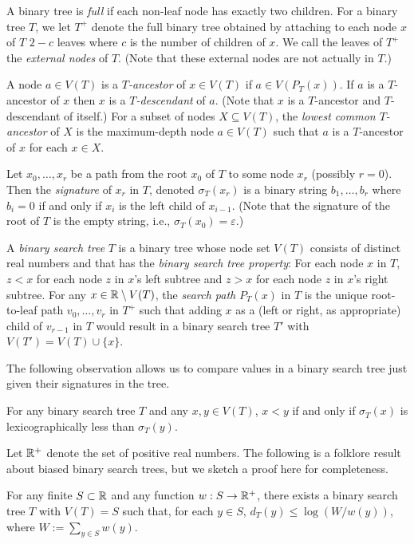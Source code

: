 \documentclass[kpfonts]{patmorin}
\let\le\leqslant
\begin{document}
A binary tree is \emph{full} if each non-leaf node has exactly two children. For a binary tree $T$, we let $T^+$ denote the full binary tree obtained by attaching to each node $x$ of $T$ $2-c$ leaves where $c$ is the number of children of $x$.  We call the leaves of $T^+$ the \emph{external nodes} of $T$.  (Note that these external nodes are not actually in $T$.)

A node $a\in V(T)$ is a \emph{$T$-ancestor} of $x\in V(T)$ if $a\in V(P_T(x))$. If $a$ is a $T$-ancestor of $x$ then $x$ is a \emph{$T$-descendant} of $a$. (Note that $x$ is a $T$-ancestor and $T$-descendant of itself.)  For a subset of nodes $X\subseteq V(T)$, the \emph{lowest common $T$-ancestor} of $X$ is the maximum-depth node $a\in V(T)$ such that $a$ is a $T$-ancestor of $x$ for each $x\in X$.  

Let $x_0,\ldots,x_{r}$ be a path from the root $x_0$ of $T$ to some node $x_r$ (possibly $r=0$).  Then the \emph{signature} of $x_r$ in $T$, denoted $\sigma_T(x_r)$ is a binary string $b_1,\ldots,b_r$ where $b_i=0$ if and only if $x_{i}$ is the left child of $x_{i-1}$.  (Note that the signature of the root of $T$ is the empty string, i.e., $\sigma_T(x_0)=\varepsilon$.)

A \emph{binary search tree} $T$ is a binary tree whose node set $V(T)$ consists of distinct real numbers and that has the \emph{binary search tree property}:  For each node $x$ in $T$, $z<x$ for each node $z$ in $x$'s left subtree and $z>x$ for each node $z$ in $x$'s right subtree. For any $x\in\mathbb{R}\setminus V(T)$, the \emph{search path} $P_T(x)$ in $T$ is the unique root-to-leaf path $v_0,\ldots,v_r$ in $T^+$ such that adding $x$ as a (left or right, as appropriate) child of $v_{r-1}$ in $T$ would result in a binary search tree $T'$ with $V(T')=V(T)\cup\{x\}$.

The following observation allows us to compare values in a binary search tree just given their signatures in the tree.

\begin{obs}
  For any binary search tree $T$ and any $x,y\in V(T)$, $x<y$ if and only if $\sigma_T(x)$ is lexicographically less than $\sigma_T(y)$.
\end{obs}

Let $\mathbb{R}^+$ denote the set of positive real numbers. The following is a folklore result about biased binary search trees, but we sketch a proof here for completeness.

\begin{lem}
  For any finite $S\subset \mathbb{R}$ and any function $w:S\to\mathbb{R}^+$, there exists a binary search tree $T$ with $V(T)=S$ such that, for each $y\in S$, $d_T(y)\le\log(W/w(y))$, where $W:=\sum_{y\in S} w(y)$.
\end{lem}
\end{document}
